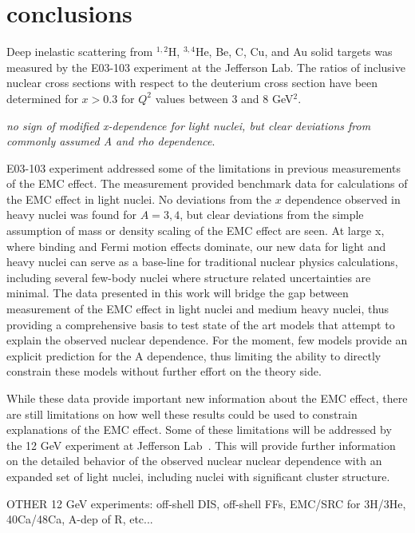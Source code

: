 \section{conclusions}\label{concl.sec}

Deep inelastic scattering from $^{1,2}$H, $^{3,4}$He, Be, C, Cu, and Au solid
targets was measured by the E03-103 experiment at the Jefferson Lab. The
ratios of inclusive nuclear cross sections with respect to the deuterium cross
section have been determined for $x>0.3$ for $Q^2$ values between 3 and 8
GeV$^2$.

\textit{no sign of modified x-dependence for light nuclei, but clear deviations
from commonly assumed A and rho dependence}. 

E03-103 experiment addressed some of the limitations in previous measurements
of the EMC effect. The measurement provided benchmark data for calculations of
the EMC effect in light nuclei.  No deviations from the $x$ dependence observed
in heavy nuclei was found for $A=3,4$, but clear deviations from the simple
assumption of mass or density scaling of the EMC effect are seen.  At large x,
where binding and Fermi motion effects dominate, our new data for light and
heavy nuclei can serve as a base-line for traditional nuclear physics
calculations, including several few-body nuclei where structure related
uncertainties are minimal. The data presented in this work will bridge the gap
between measurement of the EMC effect in light nuclei and medium heavy nuclei,
thus providing a comprehensive basis to test state of the art models that
attempt to explain the observed nuclear dependence.  For the moment, few
models provide an explicit prediction for the A dependence, thus limiting the
ability to directly constrain these models without further effort on the
theory side.

While these data provide important new information about the EMC effect, there
are still limitations on how well these results could be used to constrain
explanations of the EMC effect. Some of these limitations will be addressed by
the 12 GeV experiment at Jefferson Lab~\cite{e12008_proposal}. This will
provide further information on the detailed behavior of the observed nuclear
nuclear dependence with an expanded set of light nuclei, including nuclei with
significant cluster structure.

OTHER 12 GeV experiments: off-shell DIS, off-shell FFs, EMC/SRC for 
3H/3He, 40Ca/48Ca, A-dep of R, etc...


